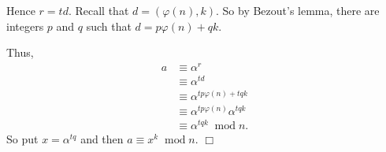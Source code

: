 \documentclass[10pt]{article}
\newenvironment{proof}[1][Proof]{\begin{trivlist}
\item[\hskip \labelsep {\bfseries #1}]}{\end{trivlist}}
\newcommand{\modulo}[1]{\;\operatorname{mod} #1}
\begin{document}
\begin{proof}
        Hence $r = td$. Recall that $d = (\varphi(n),k)$. So by Bezout's lemma, there
        are integers $p$ and $q$ such that $d = p\varphi(n)+qk$. 
        
        Thus,
        \begin{align*}
            a&\equiv\alpha^r\\
            &\equiv \alpha^{td}\\
            &\equiv \alpha^{tp\varphi(n)+tqk}\\
            &\equiv \alpha^{tp\varphi(n)}\alpha^{tqk}\\
            &\equiv \alpha^{tqk}\modulo{n}.
        \end{align*}
        So put $x = \alpha^{tq}$ and then $a\equiv x^k\modulo{n}$. $\Box$
       



        
                

\end{proof}
\end{document}
